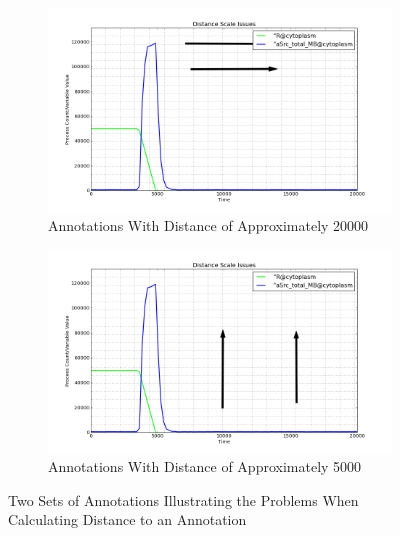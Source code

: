 \begin{figure}[h!]
    \centering
    \begin{subfigure}[b]{0.6\textwidth}
        \centering
        \includegraphics[width=\textwidth]{images/distance_scale_a.png}
        \caption{Annotations With Distance of Approximately 20000}
        \label{fig:distance_scale_a}
    \end{subfigure}

    \begin{subfigure}[b]{0.6\textwidth}
        \centering
        \includegraphics[width=\textwidth]{images/distance_scale_b.png}
        \caption{Annotations With Distance of Approximately 5000}
        \label{fig:distance_scale_b}
    \end{subfigure}
    \caption{Two Sets of Annotations Illustrating the Problems When Calculating Distance to an Annotation}
    \label{fig:distance_scale}
\end{figure}

